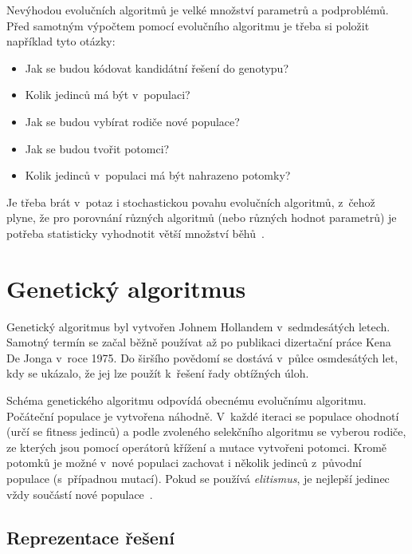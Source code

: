 Nevýhodou evolučních algoritmů je velké množství parametrů a podproblémů. Před samotným výpočtem pomocí evolučního algoritmu je třeba si položit například tyto otázky:

\begin{itemize}
    \item Jak se budou kódovat kandidátní řešení do genotypu?
    \item Kolik jedinců má být v~populaci?
    \item Jak se budou vybírat rodiče nové populace?
    \item Jak se budou tvořit potomci?
    \item Kolik jedinců v~populaci má být nahrazeno potomky?
\end{itemize}

Je třeba brát v~potaz i stochastickou povahu evolučních algoritmů, z~čehož plyne, že pro porovnání různých algoritmů (nebo různých hodnot parametrů) je potřeba statisticky vyhodnotit větší množství běhů~\cite{HandbookEA, Modra}.


\section{Genetický algoritmus}
\label{secGA}

Genetický algoritmus byl vytvořen Johnem Hollandem v~sedmdesátých letech. Samotný termín  se začal běžně používat až po publikaci dizertační práce Kena De Jonga v~roce 1975. Do širšího povědomí se dostává v~půlce osmdesátých let, kdy se ukázalo, že jej lze použít k~řešení řady obtížných úloh.


Schéma genetického algoritmu odpovídá obecnému evolučnímu algoritmu. Počáteční populace je vytvořena náhodně. V~každé iteraci se populace ohodnotí (určí se fitness jedinců) a podle zvoleného selekčního algoritmu se vyberou rodiče, ze kterých jsou pomocí operátorů křížení a mutace vytvořeni potomci. Kromě potomků je možné v~nové populaci zachovat i několik jedinců z~původní populace (s~případnou mutací). Pokud se používá \emph{elitismus}, je nejlepší jedinec vždy součástí nové populace~\cite{Modra, HandbookGA}.


\subsection{Reprezentace řešení}

